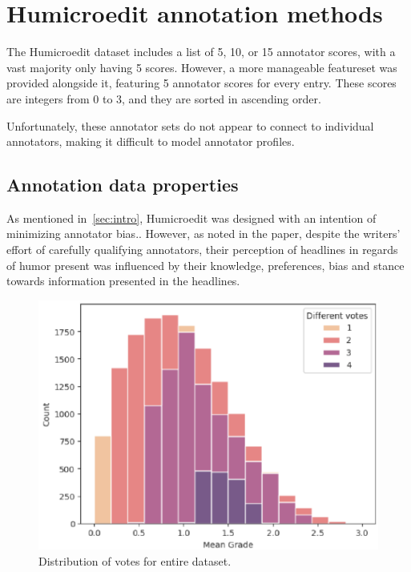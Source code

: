 \documentclass[10pt, a4paper]{article}
\begin{document}
\section{Humicroedit annotation methods}

The Humicroedit dataset includes a list of 5, 10, or 15 annotator scores, with a vast majority only having 5 scores. However, a more manageable featureset was provided alongside it, featuring 5 annotator scores for every entry. These scores are integers from 0 to 3, and they are sorted in ascending order.

Unfortunately, these annotator sets do not appear to connect to individual annotators, making it difficult to model annotator profiles.

\subsection{Annotation data properties}
 
As mentioned in~\ref{sec:intro}, Humicroedit was designed with an intention of minimizing annotator bias.. However, as noted in the paper, despite the writers' effort of carefully qualifying annotators, their perception of headlines in regards of humor present was influenced by their knowledge, preferences, bias and stance towards information presented in the headlines.

\begin{figure}
\begin{center}
\includegraphics[width=\columnwidth]{vote distribution.pdf}
\caption{Distribution of votes for entire dataset.}
\label{fig:figure1}
\end{center}
\end{figure}
\end{document}
